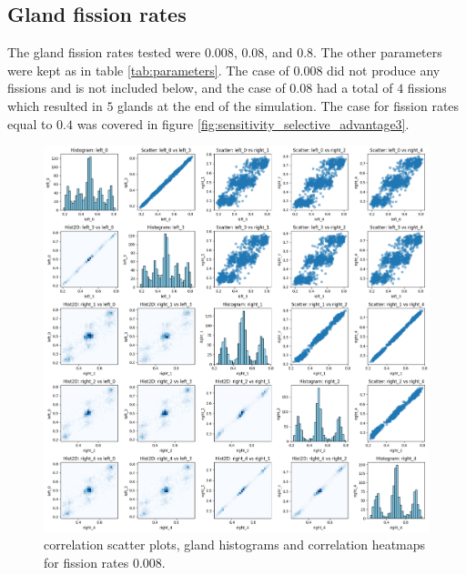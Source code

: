 \subsection{Gland fission rates}
The gland fission rates tested were $0.008$, $0.08$, and $0.8$. The other parameters were kept as in table \ref{tab:parameters}. The case of $0.008$ did not produce any fissions and is not included below, and the case of $0.08$ had a total of $4$ fissions which resulted in $5$ glands at the end of the simulation. The case for fission rates equal to $0.4$ was covered in figure \ref{fig:sensitivity_selective_advantage3}.
\begin{figure}[h]
    \centering
    \includegraphics[width=\textwidth]{Chapter_5/figures/sensitivity_migrate1.png}
    \caption{correlation scatter plots, gland histograms and correlation heatmaps for fission rates $0.008$.}
    \label{fig:sensitivity_migrates1}
\end{figure}
